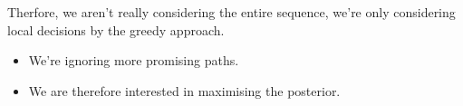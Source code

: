\documentclass[11pt]{article}
\begin{document}
\begin{warning}
    Therfore, we aren't really considering the entire sequence, we're only considering local decisions by the greedy approach.
\end{warning}

\begin{figure}[H]
    \centering
\end{figure}

\begin{minipage}[l]{.5\linewidth}
    \begin{figure}[H]
        \centering
    \end{figure}    
\end{minipage}\hfill
\begin{minipage}[r]{.48\linewidth}
    \begin{itemize}
        \item We're ignoring more promising paths.
        \item We are therefore interested in maximising the posterior.
    \end{itemize}
\end{minipage}
\end{document}
